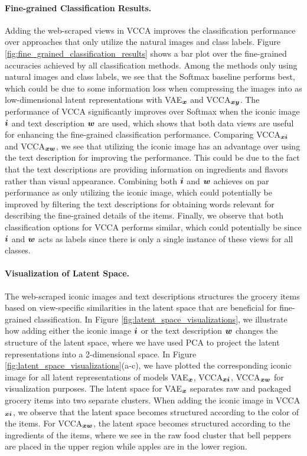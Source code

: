 \paragraph{Fine-grained Classification Results.} Adding the web-scraped views in VCCA improves the classification performance over approaches that only utilize the natural images and class labels. Figure \ref{fig:fine_grained_classification_results} shows a bar plot over the fine-grained accuracies achieved by all classification methods. Among the methods only using natural images and class labels, we see that the Softmax baseline performs best, which could be due to some information loss when compressing the images into as low-dimensional latent representations with VAE$_{{\bm{x}}}$ and VCCA$_{{\bm{x}} {\bm{y}}}$. The performance of VCCA significantly improves over Softmax when the iconic image ${\bm{i}}$ and text description ${\bm{w}}$ are used, which shows that both data views are useful for enhancing the fine-grained classification performance. Comparing VCCA$_{{\bm{x}} {\bm{i}}}$ and VCCA$_{{\bm{x}} {\bm{w}}}$, we see that utilizing the iconic image has an advantage over using the text description for improving the performance. This could be due to the fact that the text descriptions are providing information on ingredients and flavors rather than visual appearance. Combining both ${\bm{i}}$ and ${\bm{w}}$ achieves on par performance as only utilizing the iconic image, which could potentially be improved by filtering the text descriptions for obtaining words relevant for describing the fine-grained details of the items. Finally, we observe that both classification options for VCCA performs similar, which could potentially be since ${\bm{i}}$ and ${\bm{w}}$ acts as labels since there is only a single instance of these views for all classes.  



\paragraph{Visualization of Latent Space.} The web-scraped iconic images and text descriptions structures the grocery items based on view-specific similarities in the latent space that are beneficial for fine-grained classification. In Figure \ref{fig:latent_space_visualizations}, we illustrate how adding either the iconic image ${\bm{i}}$ or the text description ${\bm{w}}$ changes the structure of the latent space, where we have used PCA to project the latent representations into a 2-dimensional space. In Figure \ref{fig:latent_space_visualizations}(a-c), we have plotted the corresponding iconic image for all latent representations of models VAE$_{{\bm{x}}}$, VCCA$_{{\bm{x}} {\bm{i}}}$, VCCA$_{{\bm{x}} {\bm{w}}}$ for visualization purposes. The latent space for VAE$_{{\bm{x}}}$ separates raw and packaged grocery items into two separate clusters. When adding the iconic image in VCCA$_{{\bm{x}} {\bm{i}}}$, we observe that the latent space becomes structured according to the color of the items. For VCCA$_{{\bm{x}} {\bm{w}}}$, the latent space becomes structured according to the ingredients of the items, where we see in the raw food cluster that bell peppers are placed in the upper region while apples are in the lower region. 

